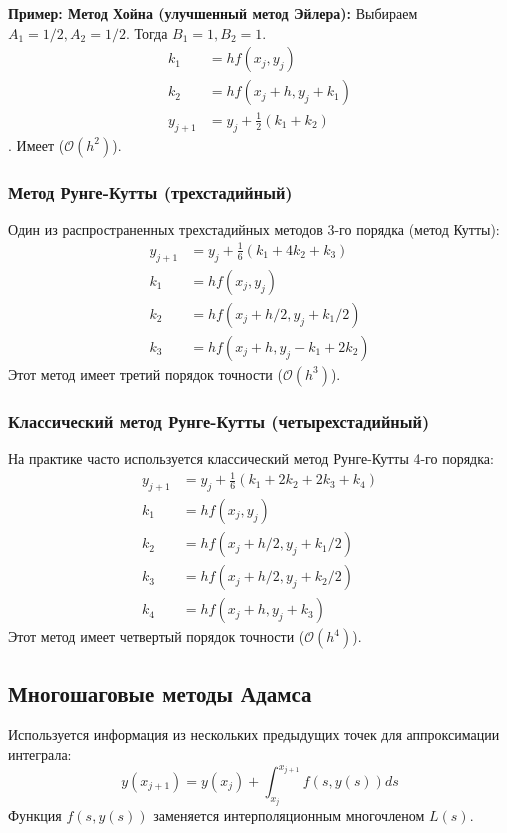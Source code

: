 \textbf{Пример: Метод Хойна (улучшенный метод Эйлера):}
Выбираем $A_1 = 1/2, A_2 = 1/2$. Тогда $B_1 = 1, B_2 = 1$.
\begin{align*} k_1 &= h f(x_j, y_j) \\ k_2 &= h f(x_j + h, y_j + k_1) \\ y_{j+1} &= y_j + \frac{1}{2} (k_1 + k_2) \end{align*}. Имеет ($\mathcal{O}(h^2)$).

\subsubsection{Метод Рунге-Кутты (трехстадийный)}
Один из распространенных трехстадийных методов 3-го порядка (метод Кутты):
\begin{align*} y_{j+1} &= y_j + \frac{1}{6} (k_1 + 4k_2 + k_3) \\ k_1 &= h f(x_j, y_j) \\ k_2 &= h f(x_j + h/2, y_j + k_1/2) \\ k_3 &= h f(x_j + h, y_j - k_1 + 2k_2) \end{align*}
Этот метод имеет третий порядок точности ($\mathcal{O}(h^3)$).

\subsubsection{Классический метод Рунге-Кутты (четырехстадийный)}
На практике часто используется классический метод Рунге-Кутты 4-го порядка:
\begin{align*} y_{j+1} &= y_j + \frac{1}{6} (k_1 + 2k_2 + 2k_3 + k_4) \\ k_1 &= h f(x_j, y_j) \\ k_2 &= h f(x_j + h/2, y_j + k_1/2) \\ k_3 &= h f(x_j + h/2, y_j + k_2/2) \\ k_4 &= h f(x_j + h, y_j + k_3) \end{align*}
Этот метод имеет четвертый порядок точности ($\mathcal{O}(h^4)$).


\subsection{Многошаговые методы Адамса}
Используется информация из нескольких предыдущих точек для аппроксимации интеграла:
\[ y(x_{j+1}) = y(x_j) + \int_{x_j}^{x_{j+1}} f(s, y(s)) ds \]
Функция $f(s, y(s))$ заменяется интерполяционным многочленом $L(s)$.

